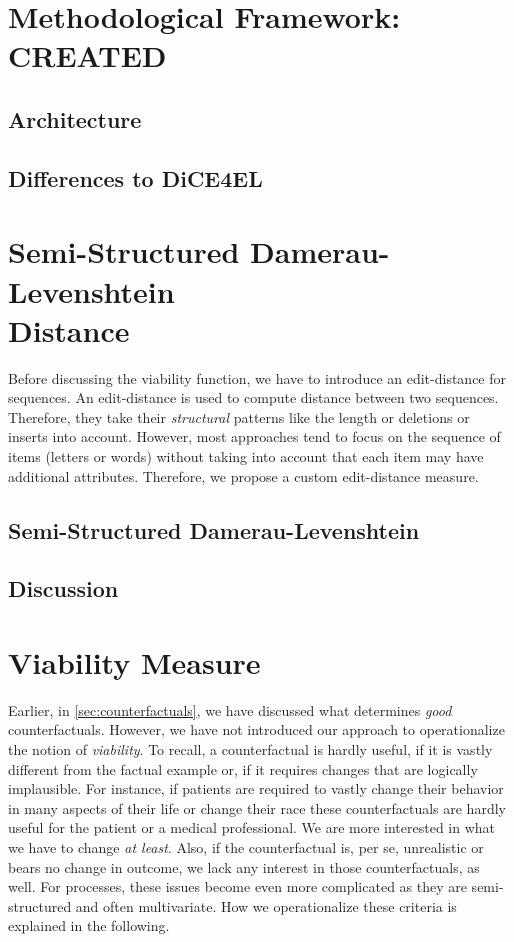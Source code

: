 \documentclass[12pt,a4paper]{report}
\begin{document}
\section{Methodological Framework: CREATED}
\label{sec:framework}
\subsection{Architecture}


\subsection{Differences to DiCE4EL}


\section{Semi-Structured Damerau-Levenshtein \\ Distance}
\label{sec:ssdld}
Before discussing the viability function, we have to introduce an edit-distance for sequences. An edit-distance is used to compute distance between two sequences. Therefore, they take their \emph{structural} patterns like the length or deletions or inserts into account. However, most approaches tend to focus on the sequence of items (letters or words) without taking into account that each item may have additional attributes. Therefore, we propose a custom edit-distance measure. 

\subsection{Semi-Structured Damerau-Levenshtein}


\subsection{Discussion}


\section{Viability Measure}
\label{sec:viability}
Earlier, in \autoref{sec:counterfactuals}, we have discussed what determines \emph{good} counterfactuals. However, we have not introduced our approach to operationalize the notion of \emph{viability}. To recall, a counterfactual is hardly useful, if it is vastly different from the factual example or, if it requires changes that are logically implausible. For instance, if patients are required to vastly change their behavior in many aspects of their life or change their race these counterfactuals are hardly useful for the patient or a medical professional. We are more interested in what we have to change \emph{at least}. Also, if the counterfactual is, per se, unrealistic or bears no change in outcome, we lack any interest in those counterfactuals, as well. For processes, these issues become even more complicated as they are semi-structured and often multivariate. How we operationalize these criteria is explained in the following.
\end{document}
